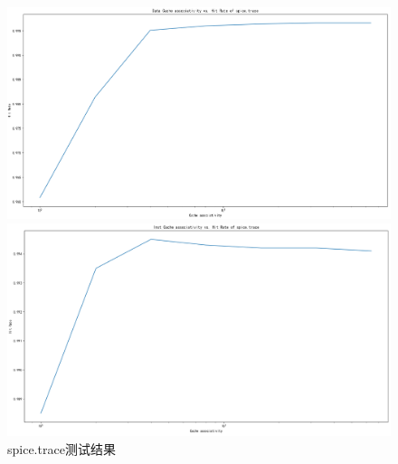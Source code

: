 \documentclass[12pt,hyperref,a4paper,UTF8]{ctexart}
\begin{document}
\begin{figure}[H]
    \centering
    \begin{minipage}[b]{0.45\textwidth}
        \centering
        \includegraphics[width=\textwidth]{./figures/fig/image27.png}
    \end{minipage}
    \hfill
    \begin{minipage}[b]{0.45\textwidth}
        \centering
        \includegraphics[width=\textwidth]{./figures/fig/image28.png}
    \end{minipage}
    \caption{spice.trace测试结果}
\end{figure}
\end{document}
